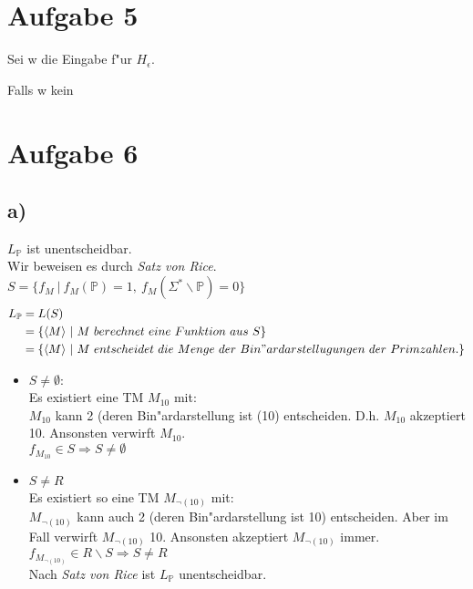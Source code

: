 \documentclass[a4paper,11pt]{scrartcl}
\begin{document}
\section*{Aufgabe 5}
Sei w die Eingabe f"ur $H_\epsilon$.

Falls w kein 

\section*{Aufgabe 6}

\subsection*{a)}

$L_{\mathbb{P}}$ ist unentscheidbar.\\
Wir beweisen es durch \textit{Satz von Rice}.\\
$S =\{ f_M\ |\ f_M(\mathbb{P}) = 1,\ f_M(\Sigma^*\backslash \mathbb{P})=0\}$
\begin{align*}
	L_{\mathbb{P}} &= L(S)\\
	&= \{\langle M\rangle \ |\ M\ berechnet\ eine\ Funktion\ aus\ S\}\\
	&= \{\langle M\rangle \ |\ M\  entscheidet\ die\ Menge\ der\ Bin"ardarstellugungen\ der\ Primzahlen. \}
\end{align*}
\begin{itemize}
	\item 
	$S \ne \emptyset :$\\
	Es existiert eine TM $M_{10}$ mit:\\
	$M_{10}$ kann 2 (deren Bin"ardarstellung ist (10) entscheiden. D.h. $M_{10}$ akzeptiert 10. Ansonsten verwirft $M_{10}$.\\
	$f_{M_{10}} \in S \Longrightarrow S \ne \emptyset$
	
	\item
	$S \ne R$\\
	Es existiert so eine TM $M_{\neg (10)}$ mit:\\
	$M_{\neg (10)}$ kann auch 2 (deren Bin"ardarstellung ist 10) entscheiden. Aber im Fall verwirft $M_{\neg (10)}$ 10. Ansonsten akzeptiert $M_{\neg (10)}$ immer.\\
	$f_{M_{\neg (10)}} \in R\backslash S \Longrightarrow S \ne R$\\
	
	Nach \textit{Satz von Rice} ist $L_{\mathbb{P}}$ unentscheidbar.
		
\end{itemize}
\end{document}
